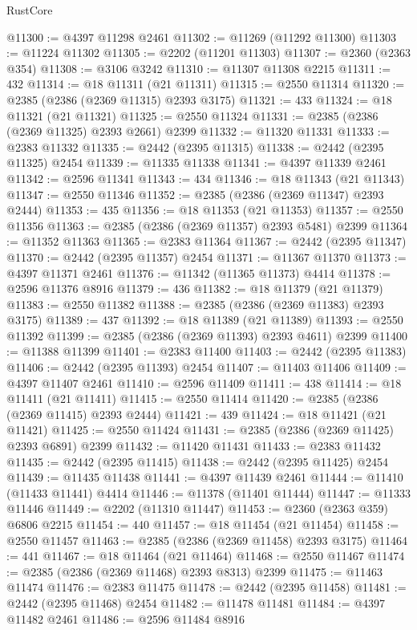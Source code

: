 \begin{lexlean}{RustCore}
\begin{coremodule}
@11300 := @4397 @11298 @2461
@11302 := @11269 (@11292 @11300)
@11303 := @11224 @11302
@11305 := @2202 (@11201 @11303)
@11307 := @2360 (@2363 @354)
@11308 := @3106 @3242
@11310 := @11307 @11308 @2215
@11311 := 432
@11314 := @18 @11311 (@21 @11311)
@11315 := @2550 @11314
@11320 := @2385 (@2386 (@2369 @11315) @2393 @3175)
@11321 := 433
@11324 := @18 @11321 (@21 @11321)
@11325 := @2550 @11324
@11331 := @2385 (@2386 (@2369 @11325) @2393 @2661) @2399
@11332 := @11320 @11331
@11333 := @2383 @11332
@11335 := @2442 (@2395 @11315)
@11338 := @2442 (@2395 @11325) @2454
@11339 := @11335 @11338
@11341 := @4397 @11339 @2461
@11342 := @2596 @11341
@11343 := 434
@11346 := @18 @11343 (@21 @11343)
@11347 := @2550 @11346
@11352 := @2385 (@2386 (@2369 @11347) @2393 @2444)
@11353 := 435
@11356 := @18 @11353 (@21 @11353)
@11357 := @2550 @11356
@11363 := @2385 (@2386 (@2369 @11357) @2393 @5481) @2399
@11364 := @11352 @11363
@11365 := @2383 @11364
@11367 := @2442 (@2395 @11347)
@11370 := @2442 (@2395 @11357) @2454
@11371 := @11367 @11370
@11373 := @4397 @11371 @2461
@11376 := @11342 (@11365 @11373) @4414
@11378 := @2596 @11376 @8916
@11379 := 436
@11382 := @18 @11379 (@21 @11379)
@11383 := @2550 @11382
@11388 := @2385 (@2386 (@2369 @11383) @2393 @3175)
@11389 := 437
@11392 := @18 @11389 (@21 @11389)
@11393 := @2550 @11392
@11399 := @2385 (@2386 (@2369 @11393) @2393 @4611) @2399
@11400 := @11388 @11399
@11401 := @2383 @11400
@11403 := @2442 (@2395 @11383)
@11406 := @2442 (@2395 @11393) @2454
@11407 := @11403 @11406
@11409 := @4397 @11407 @2461
@11410 := @2596 @11409
@11411 := 438
@11414 := @18 @11411 (@21 @11411)
@11415 := @2550 @11414
@11420 := @2385 (@2386 (@2369 @11415) @2393 @2444)
@11421 := 439
@11424 := @18 @11421 (@21 @11421)
@11425 := @2550 @11424
@11431 := @2385 (@2386 (@2369 @11425) @2393 @6891) @2399
@11432 := @11420 @11431
@11433 := @2383 @11432
@11435 := @2442 (@2395 @11415)
@11438 := @2442 (@2395 @11425) @2454
@11439 := @11435 @11438
@11441 := @4397 @11439 @2461
@11444 := @11410 (@11433 @11441) @4414
@11446 := @11378 (@11401 @11444)
@11447 := @11333 @11446
@11449 := @2202 (@11310 @11447)
@11453 := @2360 (@2363 @359) @6806 @2215
@11454 := 440
@11457 := @18 @11454 (@21 @11454)
@11458 := @2550 @11457
@11463 := @2385 (@2386 (@2369 @11458) @2393 @3175)
@11464 := 441
@11467 := @18 @11464 (@21 @11464)
@11468 := @2550 @11467
@11474 := @2385 (@2386 (@2369 @11468) @2393 @8313) @2399
@11475 := @11463 @11474
@11476 := @2383 @11475
@11478 := @2442 (@2395 @11458)
@11481 := @2442 (@2395 @11468) @2454
@11482 := @11478 @11481
@11484 := @4397 @11482 @2461
@11486 := @2596 @11484 @8916

\end{coremodule}
\end{lexlean}

